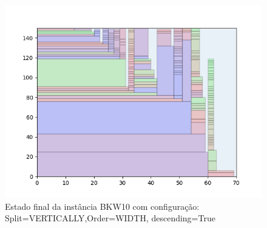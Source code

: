 \begin{figure}[H]
    \centering
    \caption[]{Estado final da instância BKW10 com configuração: Split=VERTICALLY,Order=WIDTH, descending=True}
    \label{fig:bkw10-vertically-width-true}
    \includegraphics[scale=0.5]{output/figures/bkw/bkw10/vertically/width/true/000}
\end{figure}